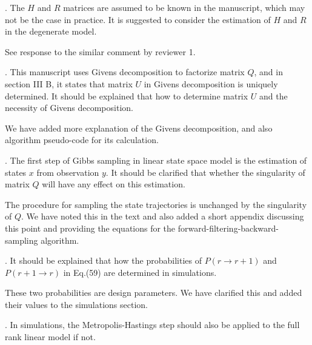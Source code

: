 \documentclass{article}
\newenvironment{review}[0]{\begin{itshape}\color{Gray}\noindent}{\end{itshape}\vspace{0.4cm}}
\newenvironment{response}[0]{\noindent}{\vspace{0.4cm}}
\begin{document}
\begin{review}
3.  The $H$ and $R$ matrices are assumed to be known in the manuscript, which may not be the case in practice. It is suggested to consider the estimation of $H$ and $R$ in the degenerate model.
\end{review}

\begin{response}
 See response to the similar comment by reviewer 1.
\end{response}

\begin{review}
4.  This manuscript uses Givens decomposition to factorize matrix $Q$, and in section III B, it states that matrix $U$ in Givens decomposition is uniquely determined. It should be explained that how to determine matrix $U$ and the necessity of Givens decomposition.
\end{review}

\begin{response}
 We have added more explanation of the Givens decomposition, and also algorithm pseudo-code for its calculation.
\end{response}

\begin{review}
5.   The first step of Gibbs sampling in linear state space model is the estimation of states $x$ from observation $y$. It should be clarified that whether the singularity of matrix $Q$ will have any effect on this estimation. 
\end{review}

\begin{response}
 The procedure for sampling the state trajectories is unchanged by the singularity of $Q$. We have noted this in the text and also added a short appendix discussing this point and providing the equations for the forward-filtering-backward-sampling algorithm.
\end{response}

\begin{review}
6.  It should be explained that how the probabilities of $P(r \to r+1)$ and $P(r+1 \to r)$ in Eq.(59) are determined in simulations.
\end{review}

\begin{response}
 These two probabilities are design parameters. We have clarified this and added their values to the simulations section.
\end{response}

\begin{review}
7.  In simulations, the Metropolis-Hastings step should also be applied to the full rank linear model if not.
\end{review}
\end{document}
